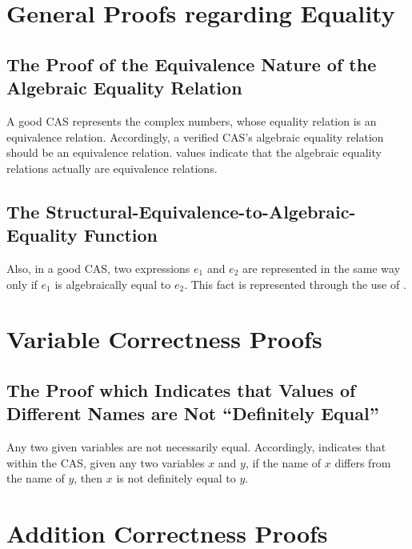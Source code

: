 \documentclass{report}
\begin{document}
\section{General Proofs regarding Equality}

\subsection{The Proof of the Equivalence Nature of the Algebraic Equality Relation}
A good CAS represents the complex numbers, whose equality relation is an equivalence relation.  Accordingly, a verified CAS's algebraic equality relation should be an equivalence relation.   values indicate that the algebraic equality relations actually are equivalence relations.

\subsection{The Structural-Equivalence-to-Algebraic-Equality Function}
Also, in a good CAS, two expressions \(e_1\) and \(e_2\) are represented in the same way only if \(e_1\) is algebraically equal to \(e_2\).  This fact is represented through the use of .

\section{Variable Correctness Proofs}

\subsection{The Proof which Indicates that Values of Different Names are Not ``Definitely Equal''}
Any two given variables are not necessarily equal.  Accordingly,   indicates that within the  CAS, given any two  variables \(x\) and \(y\), if the name of \(x\) differs from the name of \(y\), then \(x\) is not definitely equal to \(y\).

\section{Addition Correctness Proofs}
\end{document}
